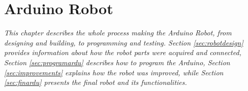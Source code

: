 \chapter{Arduino Robot}
\textit{This chapter describes the whole process making the Arduino Robot, from designing and building, to programming and testing. Section \ref{sec:robotdesign} provides information about how the robot parts were acquired and connected, Section \ref{sec:programardu} describes how to program the Arduino, Section \ref{sec:improvements} explains how the robot was improved, while Section \ref{sec:finardu} presents the final robot and its functionalities.}



